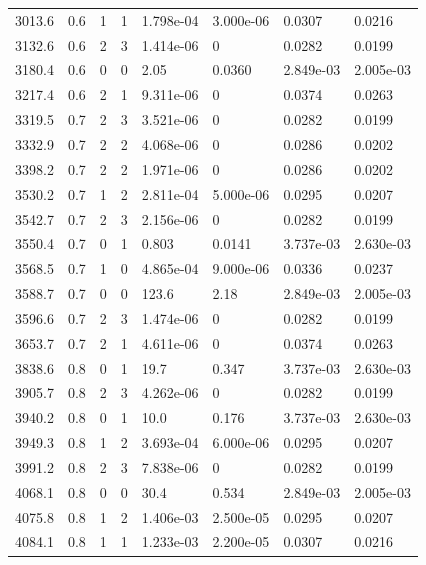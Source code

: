 \documentclass[preview]{standalone}
\begin{document}
{{{\begin{tabular}{L{1.2cm}C{1.2cm} C{0.3cm}C{0.5cm} C{1.4cm}C{1.4cm} C{1.4cm}C{1.4cm}}
  3013.6  &   0.6  & 1     &  1 &  1.798e-04  & 3.000e-06  & 0.0307 &  0.0216   \\ 
  3132.6  &   0.6  & 2     &  3 &  1.414e-06  & 0  & 0.0282 &  0.0199   \\ 
  3180.4  &   0.6  & 0     &  0 &  2.05  & 0.0360  & 2.849e-03 &  2.005e-03   \\ 
  3217.4  &   0.6  & 2     &  1 &  9.311e-06  & 0  & 0.0374 &  0.0263   \\ 
  3319.5  &   0.7  & 2     &  3 &  3.521e-06  & 0  & 0.0282 &  0.0199   \\ 
  3332.9  &   0.7  & 2     &  2 &  4.068e-06  & 0  & 0.0286 &  0.0202   \\ 
  3398.2  &   0.7  & 2     &  2 &  1.971e-06  & 0  & 0.0286 &  0.0202   \\ 
  3530.2  &   0.7  & 1     &  2 &  2.811e-04  & 5.000e-06  & 0.0295 &  0.0207   \\ 
  3542.7  &   0.7  & 2     &  3 &  2.156e-06  & 0  & 0.0282 &  0.0199   \\ 
  3550.4  &   0.7  & 0     &  1 &  0.803  & 0.0141  & 3.737e-03 &  2.630e-03   \\ 
  3568.5  &   0.7  & 1     &  0 &  4.865e-04  & 9.000e-06  & 0.0336 &  0.0237   \\ 
  3588.7  &   0.7  & 0     &  0 &  123.6  & 2.18  & 2.849e-03 &  2.005e-03   \\ 
  3596.6  &   0.7  & 2     &  3 &  1.474e-06  & 0  & 0.0282 &  0.0199   \\ 
  3653.7  &   0.7  & 2     &  1 &  4.611e-06  & 0  & 0.0374 &  0.0263   \\ 
  3838.6  &   0.8  & 0     &  1 &  19.7  & 0.347  & 3.737e-03 &  2.630e-03   \\ 
  3905.7  &   0.8  & 2     &  3 &  4.262e-06  & 0  & 0.0282 &  0.0199   \\ 
  3940.2  &   0.8  & 0     &  1 &  10.0  & 0.176  & 3.737e-03 &  2.630e-03   \\ 
  3949.3  &   0.8  & 1     &  2 &  3.693e-04  & 6.000e-06  & 0.0295 &  0.0207   \\ 
  3991.2  &   0.8  & 2     &  3 &  7.838e-06  & 0  & 0.0282 &  0.0199   \\ 
  4068.1  &   0.8  & 0     &  0 &  30.4  & 0.534  & 2.849e-03 &  2.005e-03   \\ 
  4075.8  &   0.8  & 1     &  2 &  1.406e-03  & 2.500e-05  & 0.0295 &  0.0207   \\ 
  4084.1  &   0.8  & 1     &  1 &  1.233e-03  & 2.200e-05  & 0.0307 &  0.0216   \\ 

\end{tabular}}}}
\end{document}
